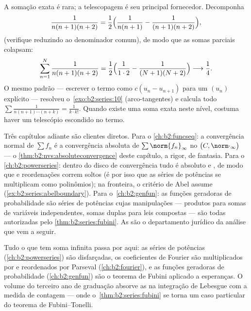 \begin{example}\label{ex:b2:series:telescope}
A somação exata é rara; a telescopagem é seu principal fornecedor.
Decomponha
\[
\frac{1}{n(n+1)(n+2)}
= \frac{1}{2}\Bigl(\frac{1}{n(n+1)} -
\frac{1}{(n+1)(n+2)}\Bigr),
\]
(verifique reduzindo ao denominador comum), de modo que as somas
parciais colapsam:
\[
\sum_{n=1}^{N}\frac{1}{n(n+1)(n+2)}
= \frac12\Bigl(\frac{1}{1\cdot2} -
\frac{1}{(N+1)(N+2)}\Bigr)
\longrightarrow \frac14 .
\]
O mesmo padrão --- escrever o termo como $c(u_n - u_{n+1})$ para
um $(u_n)$ explícito --- resolveu o~\cref{exo:b2:series:10}
(arco-tangentes) e calcula todo $\sum\frac{1}{n(n+1)\cdots(n +
k)} = \frac{1}{k\cdot k!}$. Quando existe uma soma exata neste
nível, costuma haver um telescópio escondido no termo.
\end{example}

\begin{remark}\label{rem:b2:series:perspectives}
Três capítulos adiante são clientes diretos. Para o
\cref{ch:b2:funcseq}: a convergência normal de $\sum f_n$ é a
convergência absoluta de $\sum\norm{f_n}_\infty$ no  $\bigl(C, \norm\cdot_\infty\bigr)$ --- o
\cref{thm:b2:nvs:absoluteconvergence} deste capítulo, a rigor, de fantasia. Para o
\cref{ch:b2:powerseries}: dentro do disco de convergência
tudo é absoluto e , de modo que  e
reordenações correm soltos (é por isso que as séries de potências se multiplicam como
polinômios); na fronteira, o critério de Abel assume
(\cref{ex:b2:series:abelboundary}). Para o~\cref{ch:b2:genfun}:
as funções geradoras de probabilidade são séries de potências cujas
manipulações --- produtos para somas de variáveis independentes,
somas duplas para leis compostas --- são todas autorizadas pelo
\cref{thm:b2:series:fubini}. As  são o departamento
jurídico da análise que vem a seguir.
\end{remark}

\begin{remark}
Tudo o que tem soma infinita passa por aqui: as séries de potências
(\cref{ch:b2:powerseries}) são  disfarçadas,
os coeficientes de Fourier são multiplicados por  e
reordenados por Parseval (\cref{ch:b2:fourier}), e as funções
geradoras de probabilidade (\cref{ch:b2:genfun}) são o teorema de Fubini
aplicado a esperanças. O volume do terceiro ano de graduação absorve as 
na integração de Lebesgue com a medida de contagem ---
onde o~\cref{thm:b2:series:fubini} se torna um caso particular do
teorema de Fubini--Tonelli.
\end{remark}

